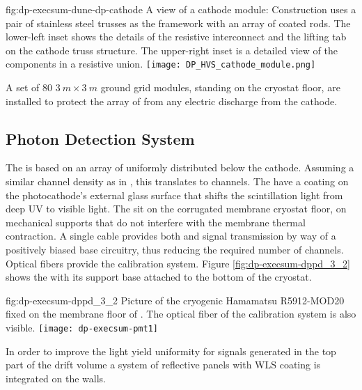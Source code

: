 \begin{dunefigure}{fig:dp-execsum-dune-dp-cathode}
{A view of a  cathode module:  Construction uses a pair of stainless steel trusses as the framework with an array of coated  rods. 
The lower-left inset shows the details of the resistive interconnect and the lifting tab on the cathode truss structure. The upper-right inset is a detailed view of the components in a resistive union.}
\texttt{[image: DP\_HVS\_cathode\_module.png]}
\end{dunefigure}

A set of 80 $3~m \times 3~m$ ground grid modules, standing on the cryostat floor, are installed to protect the array of  from any electric discharge from the cathode.


\subsection{Photon Detection System}
\label{sec:dp-execsum-pd}

The  is based on an array of  uniformly distributed below the cathode. Assuming a similar channel density as in , this translates to \dpnumpmtch channels. The  have a  coating on the photocathode's external glass surface that shifts the scintillation light from deep UV to visible light. The   sit on the corrugated membrane cryostat floor, on 
mechanical supports that do not interfere with the membrane thermal contraction. 
A single cable provides both  and signal transmission by way of a positively biased base circuitry, thus reducing the required number of \fdth{} channels. Optical fibers provide the calibration system.   Figure \ref{fig:dp-execsum-dppd_3_2} shows the  with its support base attached to the bottom of the  cryostat.

\begin{dunefigure}{fig:dp-execsum-dppd_3_2}
{Picture of the cryogenic Hamamatsu R5912-MOD20  fixed on the membrane floor of . The optical fiber of the calibration system is also visible.}
\texttt{[image: dp-execsum-pmt1]}
\end{dunefigure}

In order to improve the light yield uniformity for signals generated in the top part of the drift volume a system of reflective panels with WLS coating is integrated on the   walls.


